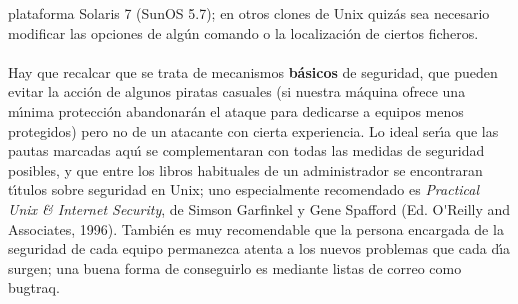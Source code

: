 plataforma Solaris 7 (SunOS 5.7); en otros clones de Unix quiz\'as sea 
necesario modificar las opciones de alg\'un comando o la localizaci\'on de 
ciertos ficheros.\\
\\Hay que recalcar que se trata de mecanismos {\bf b\'asicos} de seguridad, que
pueden evitar la acci\'on de algunos piratas casuales (si nuestra m\'aquina
ofrece una m\'{\i}nima protecci\'on abandonar\'an el ataque para dedicarse a
equipos menos protegidos) pero no de un atacante con cierta experiencia.
Lo ideal ser\'{\i}a que las pautas marcadas aqu\'{\i} se complementaran con 
todas las medidas de seguridad posibles, y que entre los libros habituales de 
un administrador se encontraran t\'{\i}tulos sobre seguridad en Unix; uno 
especialmente recomendado es {\it Practical Unix \& Internet Security}, de
Simson Garfinkel y Gene Spafford (Ed. O\'{}Reilly and Associates, 1996). 
Tambi\'en es muy recomendable que la persona encargada de la seguridad de cada
equipo permanezca atenta a los nuevos problemas que cada d\'{\i}a surgen; una
buena forma de conseguirlo es mediante listas de correo como {\sc bugtraq}.
